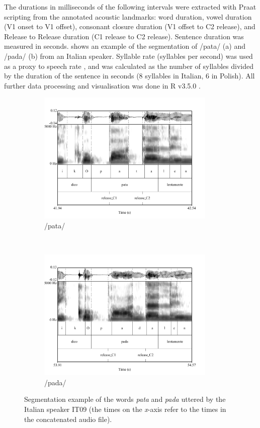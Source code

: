 \documentclass[12pt,]{article}
\begin{document}
The durations in milliseconds of the following intervals were extracted
with Praat scripting from the annotated acoustic landmarks: word
duration, vowel duration (V1 onset to V1 offset), consonant closure
duration (V1 offset to C2 release), and Release to Release duration (C1
release to C2 release). Sentence duration was measured in seconds.
 shows an example of the segmentation of /pata/ (a)
and /pada/ (b) from an Italian speaker. Syllable rate (syllables per
second) was used as a proxy to speech rate \citep{plug2018}, and was
calculated as the number of syllables divided by the duration of the
sentence in seconds (8 syllables in Italian, 6 in Polish). All further
data processing and visualisation was done in R v3.5.0
\citep{r-core-team2018, wickham2017}.

\begin{figure}
  \centering
  \begin{subfigure}[t]{0.5\textwidth}
    \centering
    \includegraphics[height=2.5in]{img/Figure1a.pdf}
    \caption{/pata/}
  \end{subfigure}%
  ~
  \begin{subfigure}[t]{0.5\textwidth}
    \centering
    \includegraphics[height=2.5in]{img/Figure1b.pdf}
    \caption{/pada/}
  \end{subfigure}
  \caption{Segmentation example of the words \textit{pata} and \textit{pada} uttered by the Italian speaker IT09 (the times on the \textit{x}-axis refer to the times in the concatenated audio file).}
\end{figure}
\end{document}
